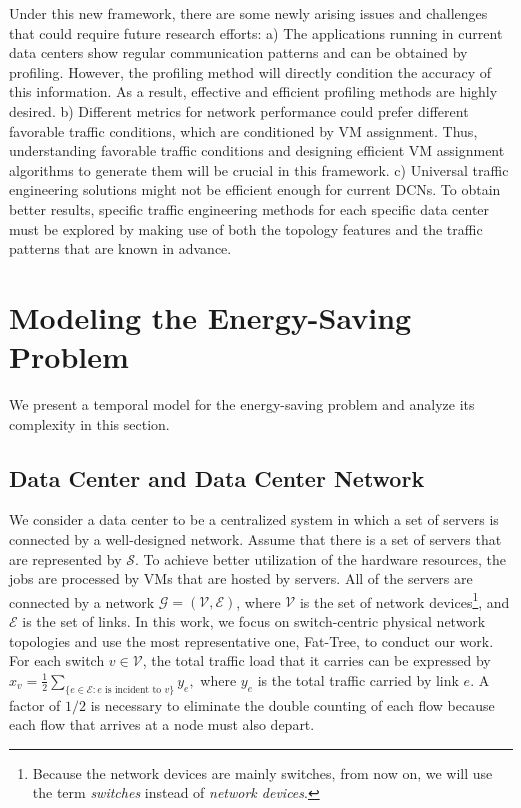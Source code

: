 \documentclass[journal,single-space,two column,twoside,10pt]{IEEEtran}
\begin{document}
Under this new framework, there are some newly arising issues and challenges that could require future research efforts: 
a) The applications running in current data centers show regular communication patterns and can be obtained by profiling. However, the profiling method will directly condition the accuracy of this information. As a result, effective and efficient profiling methods are highly desired.
b) Different metrics for network performance could prefer different favorable traffic conditions, which are conditioned by VM assignment. Thus, understanding favorable traffic conditions and designing efficient VM assignment algorithms to generate them will be crucial in this framework. 
c) Universal traffic engineering solutions might not be efficient enough for current DCNs. To obtain better results, specific traffic engineering methods for each specific data center must be explored by making use of both the topology features and the traffic patterns that are known in advance.


\section{Modeling the Energy-Saving Problem}
\label{sec:model}

We present a temporal model for the energy-saving problem and analyze its complexity in this section.

\vspace{-0.3cm}

\subsection{Data Center and Data Center Network}
\label{sec:DCandDCN}

We consider a data center to be a centralized system in which a set of servers is connected by a well-designed network. Assume that there is a set of servers that are represented by $\mathcal{S}$. To achieve better utilization of the hardware resources, the jobs are processed by VMs that are hosted by servers. All of the servers are connected by a network $\mathcal{G}=(\mathcal{V},\mathcal{E})$, where $\mathcal{V}$ is the set of network devices\footnote{Because the network devices are mainly switches, from now on, we will use the term \emph{switches} instead of \emph{network devices}.}, and $\mathcal{E}$ is the set of links. In this work, we focus on switch-centric physical network topologies and use the most representative one, Fat-Tree, to conduct our work. For each switch $v \in \mathcal{V}$, the total traffic load that it carries can be expressed by
$x_{v} = \frac{1}{2} \sum_{\{e \in \mathcal{E} : e \text{ is incident to }v\}} y_e,$
where $y_e$ is the total traffic carried by link $e$. A factor of $1/2$ is necessary to eliminate the double counting of each flow because each flow that arrives at a node must also depart.
\end{document}
